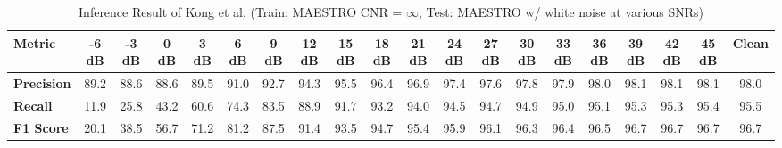 \documentclass{article}
\begin{document}
\begin{table*}[htbp]
\centering
\caption{Inference Result of Kong et al. (Train: MAESTRO CNR = $\infty$, Test: MAESTRO w/ white noise at various SNRs)}
\begin{adjustbox}{max width=\textwidth}
\begin{tabular}{@{}lccccccccccccccccccc@{}}
\toprule
\textbf{Metric} & \textbf{-6 dB} & \textbf{-3 dB} & \textbf{0 dB} & \textbf{3 dB} & \textbf{6 dB} & \textbf{9 dB} & \textbf{12 dB} & \textbf{15 dB} & \textbf{18 dB} & \textbf{21 dB} & \textbf{24 dB} & \textbf{27 dB} & \textbf{30 dB} & \textbf{33 dB} & \textbf{36 dB} & \textbf{39 dB} & \textbf{42 dB} & \textbf{45 dB} & \textbf{Clean} \\ 
\midrule
\textbf{Precision} &  89.2 & 88.6 & 88.6 & 89.5 & 91.0 & 92.7 & 94.3 & 95.5 & 96.4
& 96.9 & 97.4 & 97.6 & 97.8 & 97.9 & 98.0 & 98.1 & 98.1 & 98.1 & 98.0
\\
\textbf{Recall}    &  11.9 & 25.8 & 43.2 & 60.6 & 74.3 & 83.5 & 88.9 & 91.7 & 93.2 & 94.0 & 94.5 & 94.7 & 94.9 & 95.0 &
95.1 & 95.3 & 95.3 & 95.4 & 95.5
 \\
\textbf{F1 Score} &  20.1 & 38.5 & 56.7 &
71.2 & 81.2 & 87.5 & 91.4 & 93.5 & 94.7 &
95.4 & 95.9 & 96.1 & 96.3 & 96.4 & 96.5 &
96.7 & 96.7 & 96.7 & 96.7
 \\
\bottomrule
\end{tabular}
\end{adjustbox}
\end{table*}
\end{document}
